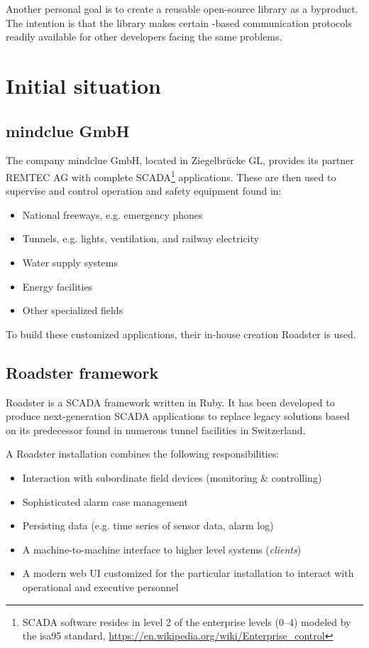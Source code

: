 Another personal goal is to create a reusable open-source library as a
byproduct. The intention is that the library makes certain \zmq-based
communication protocols readily available for other developers facing the same
problems.

\section{Initial situation}\label{sec:scope:init}

\subsection{mindclue GmbH}
The company mindclue GmbH, located in Ziegelbr\"ucke GL, provides its partner
REMTEC AG with complete \gls{SCADA}\footnote{SCADA software resides in level 2 of the enterprise levels (0--4) modeled by the \gls{isa95} standard, \url{https://en.wikipedia.org/wiki/Enterprise_control}} applications. These are then used to
supervise and control operation and safety equipment found in:

\begin{itemize}
\item National freeways, e.g. emergency phones
\item Tunnels, e.g. lights, ventilation, and railway electricity
\item Water supply systems
\item Energy facilities
\item Other specialized fields
\end{itemize}

To build these customized applications, their in-house creation
Roadster is used.

\subsection{Roadster framework}
Roadster is a SCADA framework written in Ruby. It has been developed to
produce next-generation SCADA applications to replace legacy
solutions based on its predecessor found in numerous tunnel
facilities in Switzerland.

A Roadster installation combines the following responsibilities:

\begin{itemize}
	\item Interaction with subordinate field devices (monitoring \& controlling)
	\item Sophisticated alarm case management
	\item Persisting data (e.g. time series of sensor data, alarm log)
	\item A machine-to-machine interface to higher level systems (\emph{clients})
	\item A modern web UI customized for the particular installation to interact with operational and executive personnel
\end{itemize}


